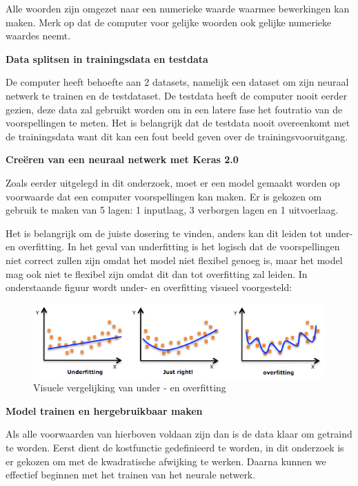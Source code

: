 Alle woorden zijn omgezet naar een numerieke waarde waarmee bewerkingen kan maken. Merk op dat de computer voor gelijke woorden ook gelijke numerieke waardes neemt. 

\textbf{Data splitsen in trainingsdata en testdata}

De computer heeft behoefte aan 2 datasets, namelijk een dataset om zijn neuraal netwerk te trainen en de testdataset. De testdata heeft de computer nooit eerder gezien, deze data zal gebruikt worden om in een latere fase het foutratio van de voorspellingen te meten. Het is belangrijk dat de testdata nooit overeenkomt met de trainingsdata want dit kan een fout beeld geven over de trainingsvooruitgang.

\textbf{Creëren van een neuraal netwerk met Keras 2.0}

Zoals eerder uitgelegd in dit onderzoek, moet er een model gemaakt worden op voorwaarde dat een computer voorspellingen kan maken. Er is gekozen om gebruik te maken van 5 lagen: 1 inputlaag, 3 verborgen lagen en 1 uitvoerlaag. 

Het is belangrijk om de juiste dosering te vinden, anders kan dit leiden tot under- en overfitting. In het geval van underfitting is het logisch dat de voorspellingen niet correct zullen zijn omdat het model niet flexibel genoeg is, maar het model mag ook niet te flexibel zijn omdat dit dan tot overfitting zal leiden. In onderstaande figuur wordt under- en overfitting visueel voorgesteld: 

\vspace{2em}
\begin{figure}[h!]
\centering
\includegraphics[width=1\textwidth]{bachproef/img/overfitting.png}
\caption{Visuele vergelijking van under - en overfitting \autocite{quora.com}}
\end{figure}

\newpage

\textbf{Model trainen en hergebruikbaar maken}

Als alle voorwaarden van hierboven voldaan zijn dan is de data klaar om getraind te worden. Eerst dient de kostfunctie gedefinieerd te worden, in dit onderzoek is er gekozen om met de kwadratische afwijking te werken. Daarna kunnen we effectief beginnen met het trainen van het neurale netwerk. 

